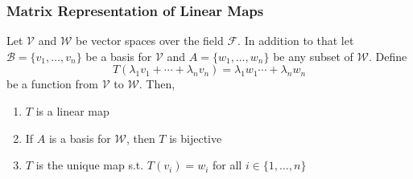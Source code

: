 \subsubsection{Matrix Representation of Linear Maps}\label{subsubsec-matrix-rep-linear-maps}

\begin{thm}\label{thm-unique-bijective-linear-map}
	Let $\mathcal{V}$ and $\mathcal{W}$ be vector spaces over the field $\mathcal{F}$.
	In addition to that let $\mathcal{B}=\{v_1,\dots,v_n\}$ be a basis for
	$\mathcal{V}$ and $A=\{w_1,\dots,w_n\}$ be any subset of $\mathcal{W}$. Define
	\begin{equation*}
		T(\lambda_1v_1+\cdots+\lambda_nv_n)=\lambda_1w_1\cdots+\lambda_nw_n
	\end{equation*}
	be a function from $\mathcal{V}$ to $\mathcal{W}$. Then,
	\begin{enumerate}
		\item $T$ is a linear map
		\item If $A$ is a basis for $\mathcal{W}$, then $T$ is bijective
		\item $T$ is the unique map s.t. $T(v_i)=w_i$ for all $i\in\{1,\dots,n\}$
	\end{enumerate}
\end{thm}

